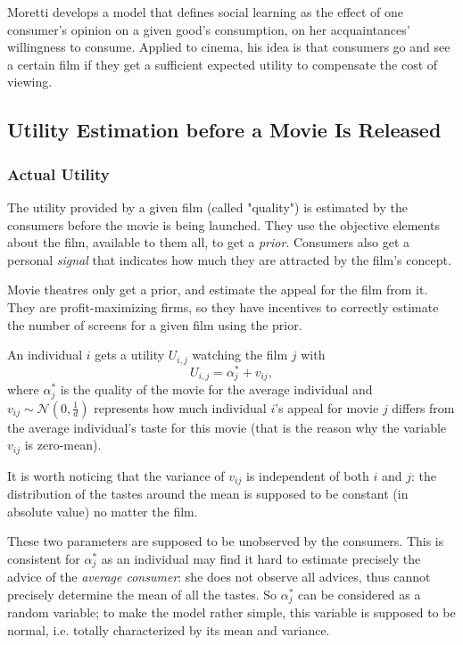 			Moretti develops a model that defines social learning as the effect of one consumer's opinion on a given good's consumption, on her acquaintances' willingness to consume.
			Applied to cinema, his idea is that consumers go and see a certain film if they get a sufficient expected utility to compensate the cost of viewing.
	\subsection{Utility Estimation before a Movie Is Released}	
	\subsubsection{Actual Utility}
			The utility provided by a given film (called "quality") is estimated by the consumers before the movie is being launched. They use the objective elements about the film, available to them all, to get a \textit{prior}. Consumers also get a personal \textit{signal} that indicates how much they are attracted by the film's concept.

			Movie theatres only get a prior, and estimate the appeal for the film from it. They are profit-maximizing firms, so they have incentives to correctly estimate the number of screens for a given film using the prior.

	An individual $i$ gets a utility $U_{i,j}$ watching the film $j$ with
	\begin{equation} \label{eq:1}
	U_{i,j}=\alpha_{j}^{*}+v_{i j},
	\end{equation}
	where $\alpha_{j}^{*}$ is the quality of the movie for the average individual and $v_{i j}\sim \mathcal{N}(0,\frac{1}{d})$ represents how much individual $i$'s appeal for movie $j$ differs from the average individual's taste for this movie (that is the reason why the variable $v_{i j}$ is zero-mean).

	It is worth noticing that the variance of $v_{i j}$ is independent of both $i$ and $j$: the distribution of the tastes around the mean is supposed to be constant (in absolute value) no matter the film.
	
	These two parameters are supposed to be unobserved by the consumers. This is consistent for $\alpha_{j}^{*}$ as an individual may find it hard to estimate precisely the advice of the \textit{average consumer}: she does not observe all advices, thus cannot precisely determine the mean of all the tastes. So $\alpha_{j}^{*}$ can be considered as a random variable; to make the model rather simple, this variable is supposed to be normal, i.e. totally characterized by its mean and variance.
	
